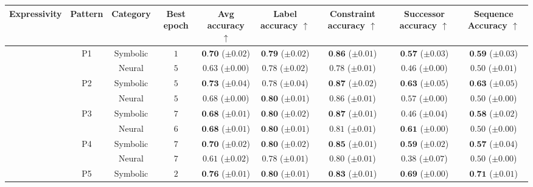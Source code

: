 \begin{table}[!t]
\centering
	\begin{tabular}{ccccccccc}
		\toprule
		Expressivity & Pattern & Category & Best epoch & Avg accuracy $\uparrow$ & Label accuracy $\uparrow$ & Constraint accuracy $\uparrow$ & Successor accuracy $\uparrow$ & Sequence Accuracy $\uparrow$\\
		\midrule
		\multirow{19}{*}{\rotatebox[origin=c]{90}{FOL}} & \multirow{2}{*}{P1} & Symbolic & $1$ & $\textbf{0.70} $ {\tiny ($\pm 0.02$)} & $\textbf{0.79} $ {\tiny ($\pm 0.02$)} & $\textbf{0.86} $ {\tiny ($\pm 0.01$)} & $\textbf{0.57} $ {\tiny ($\pm 0.03$)} & $\textbf{0.59} $ {\tiny ($\pm 0.03$)}\\
		& & Neural & $5$ & $0.63 $ {\tiny ($\pm 0.00$)} & $0.78 $ {\tiny ($\pm 0.02$)} & $0.78 $ {\tiny ($\pm 0.01$)} & $0.46 $ {\tiny ($\pm 0.00$)} & $0.50 $ {\tiny ($\pm 0.01$)}\\
		\cmidrule{2-9}
		& \multirow{2}{*}{P2} & Symbolic & $5$ & $\textbf{0.73} $ {\tiny ($\pm 0.04$)} & $0.78 $ {\tiny ($\pm 0.04$)} & $\textbf{0.87} $ {\tiny ($\pm 0.02$)} & $\textbf{0.63} $ {\tiny ($\pm 0.05$)} & $\textbf{0.63} $ {\tiny ($\pm 0.05$)}\\
		& & Neural & $5$ & $0.68 $ {\tiny ($\pm 0.00$)} & $\textbf{0.80} $ {\tiny ($\pm 0.01$)} & $0.86 $ {\tiny ($\pm 0.01$)} & $0.57 $ {\tiny ($\pm 0.00$)} & $0.50 $ {\tiny ($\pm 0.00$)}\\
		\cmidrule{2-9}
		& \multirow{2}{*}{P3} & Symbolic & $7$ & $\textbf{0.68} $ {\tiny ($\pm 0.01$)} & $\textbf{0.80} $ {\tiny ($\pm 0.02$)} & $\textbf{0.87} $ {\tiny ($\pm 0.01$)} & $0.46 $ {\tiny ($\pm 0.04$)} & $\textbf{0.58} $ {\tiny ($\pm 0.02$)}\\
		&  & Neural & $6$ & $\textbf{0.68} $ {\tiny ($\pm 0.01$)} & $\textbf{0.80} $ {\tiny ($\pm 0.01$)} & $0.81 $ {\tiny ($\pm 0.01$)} & $\textbf{0.61} $ {\tiny ($\pm 0.00$)} & $0.50 $ {\tiny ($\pm 0.00$)}\\
		\cmidrule{2-9}
		& \multirow{2}{*}{P4} & Symbolic & $7$ & $\textbf{0.70} $ {\tiny ($\pm 0.02$)} & $\textbf{0.80} $ {\tiny ($\pm 0.02$)} & $\textbf{0.85} $ {\tiny ($\pm 0.01$)} & $\textbf{0.59} $ {\tiny ($\pm 0.02$)} & $\textbf{0.57} $ {\tiny ($\pm 0.04$)}\\
		&  & Neural & $7$ & $0.61 $ {\tiny ($\pm 0.02$)} & $0.78 $ {\tiny ($\pm 0.01$)} & $0.80 $ {\tiny ($\pm 0.01$)} & $0.38 $ {\tiny ($\pm 0.07$)} & $0.50 $ {\tiny ($\pm 0.00$)}\\
		\cmidrule{2-9}
		& \multirow{2}{*}{P5} & Symbolic & $2$ & $\textbf{0.76} $ {\tiny ($\pm 0.01$)} & $\textbf{0.80} $ {\tiny ($\pm 0.01$)} & $\textbf{0.83} $ {\tiny ($\pm 0.01$)} & $\textbf{0.69} $ {\tiny ($\pm 0.00$)} & $\textbf{0.71} $ {\tiny ($\pm 0.01$)}\\

\end{tabular}
\end{table}
